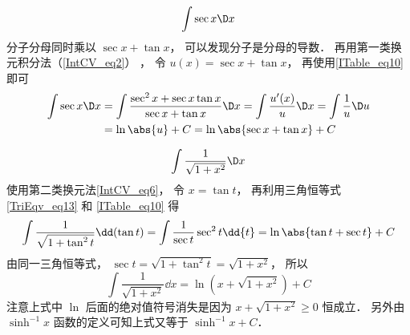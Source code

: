 \begin{exam}{}\label{ITable_ex10}
\begin{equation}
\int \sec x \D x
\end{equation}
分子分母同时乘以 $\sec x + \tan x$， 可以发现分子是分母的导数． 再用第一类换元积分法（\autoref{IntCV_eq2}） ， 令 $u(x) = \sec x + \tan x$， 再使用\autoref{ITable_eq10} 即可
\begin{equation}\begin{aligned}
\int \sec x \D x &= \int \frac{\sec^2 x + \sec x\tan x}{\sec x + \tan x} \D x = \int \frac{u'(x)}{u} \D x = \int \frac 1u \D u \\
&= \ln\abs{u}+C = \ln\abs{\sec x + \tan x}+C
\end{aligned}\end{equation}
\end{exam}


\begin{exam}{}\label{ITable_ex9}
\begin{equation}
\int \frac{1}{\sqrt{1+x^2}} \D x
\end{equation}
使用第二类换元法\autoref{IntCV_eq6}， 令 $x = \tan t$， 再利用三角恒等式\autoref{TriEqv_eq13} 和 \autoref{ITable_eq10} 得
\begin{equation}
\int \frac{1}{\sqrt{1+\tan^2 t}} \dd(\tan t) = \int \frac{1}{\sec t} \sec^2 t\dd{t}
 = \ln\abs{\tan t + \sec t} + C
\end{equation}
由同一三角恒等式， $\sec t = \sqrt{1+\tan^2 t} = \sqrt{1+x^2}$， 所以
\begin{equation}
\int \frac{1}{\sqrt{1+x^2}} \dd{x} = \ln(x + \sqrt{1+x^2}) + C
\end{equation}
注意上式中 $\ln$ 后面的绝对值符号消失是因为 $x + \sqrt{1+x^2}\ge 0 $ 恒成立． 另外由 $\sinh^{-1} x$ 函数的定义可知上式又等于 $\sinh^{-1} x + C$．
\end{exam}